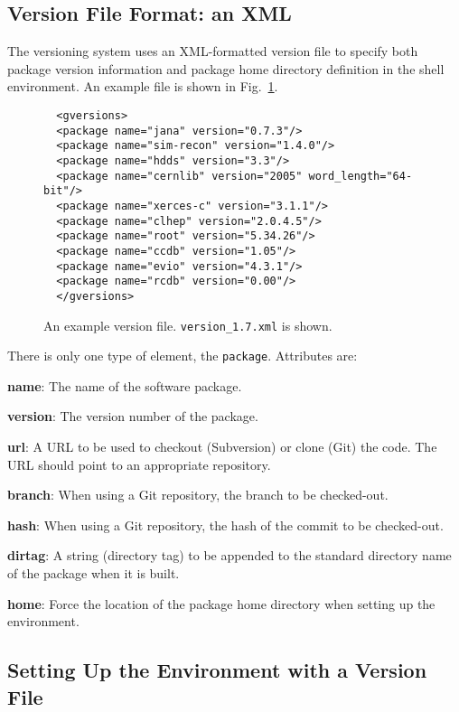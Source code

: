 \documentclass[12pt]{article}
\begin{document}
\subsection{Version File Format: an XML}

The versioning system uses an XML-formatted version file to specify
both package version information and package home directory definition
in the shell environment. An example file is shown in
Fig.~\ref{figure:version-xml}.

\begin{figure}
\begin{verbatim}
  <gversions>
  <package name="jana" version="0.7.3"/>
  <package name="sim-recon" version="1.4.0"/>
  <package name="hdds" version="3.3"/>
  <package name="cernlib" version="2005" word_length="64-bit"/>
  <package name="xerces-c" version="3.1.1"/>
  <package name="clhep" version="2.0.4.5"/>
  <package name="root" version="5.34.26"/>
  <package name="ccdb" version="1.05"/>
  <package name="evio" version="4.3.1"/>
  <package name="rcdb" version="0.00"/>
  </gversions>
\end{verbatim}
\caption{An example version file. {\tt version\_1.7.xml} is shown.}\label{figure:version-xml}
\end{figure}

There is only one type of element, the {\tt package}. Attributes are:

\begin{description}
\item{\bf name}: The name of the software package.
\item{\bf version}: The version number of the package.
\item{\bf url}: A URL to be used to checkout (Subversion) or clone
  (Git) the code. The URL should point to an appropriate repository.
\item{\bf branch}: When using a Git repository, the branch to be
  checked-out.
\item{\bf hash}: When using a Git repository, the hash of the commit to be checked-out.
\item{\bf dirtag}: A string (directory tag) to be appended to the
  standard directory name of the package when it is built.
\item{\bf home}: Force the location of the package home directory when setting up the environment.
\end{description}

\subsection{Setting Up the Environment with a Version File}
\end{document}
